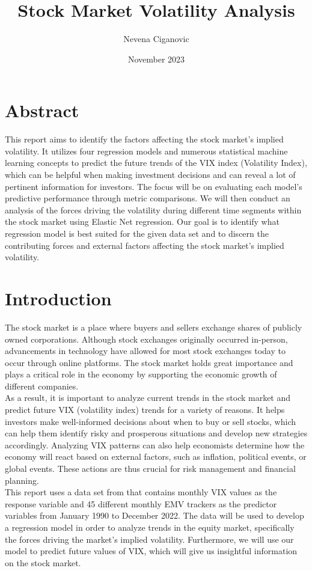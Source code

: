 \documentclass{article}
\title{Stock Market Volatility Analysis}
\author{Nevena Ciganovic}
\date{November 2023}
\begin{document}
\maketitle

\section{Abstract}
This report aims to identify the factors affecting the stock market’s implied volatility. It utilizes four regression models and numerous statistical machine learning concepts to predict the future trends of the VIX index (Volatility Index), which can be helpful when making investment decisions and can reveal a lot of pertinent information for investors. The focus will be on evaluating each model's predictive performance through metric comparisons. We will then conduct an analysis of the forces driving the volatility during different time segments within the stock market using Elastic Net regression. Our goal is to identify what regression model is best suited for the given data set and to discern the contributing forces and external factors affecting the stock market's implied volatility.

\section{Introduction}
The stock market is a place where buyers and sellers exchange shares of publicly owned corporations. Although stock exchanges originally occurred in-person, advancements in technology have allowed for most stock exchanges today to occur through online platforms. The stock market holds great importance and plays a critical role in the economy by supporting the economic growth of different companies.\\

As a result, it is important to analyze current trends in the stock market and predict future VIX (volatility index) trends for a variety of reasons. It helps investors make well-informed decisions about when to buy or sell stocks, which can help them identify risky and prosperous situations and develop new strategies accordingly. Analyzing VIX patterns can also help economists determine how the economy will react based on external factors, such as inflation, political events, or global events. These actions are thus crucial for risk management and financial planning.\\

\newpage
This report uses a data set from that contains monthly VIX values as the response variable and 45 different monthly EMV trackers as the predictor variables from January 1990 to December 2022. The data will be used to develop a regression model in order to analyze trends in the equity market, specifically the forces driving the market’s implied volatility. Furthermore, we will use our model to predict future values of VIX, which will give us insightful information on the stock market.\\
\end{document}
